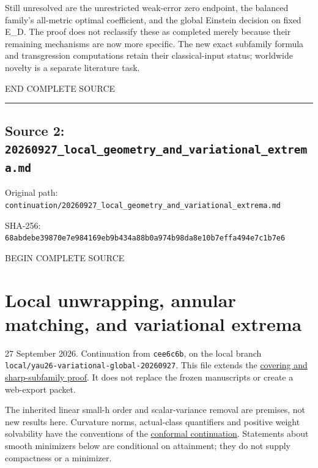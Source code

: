 \documentclass[
  10pt,
]{article}
\begin{document}
Still unresolved are the unrestricted weak-error zero endpoint, the
balanced family's all-metric optimal coefficient, and the global
Einstein decision on fixed E\_D. The proof does not reclassify these as
completed merely because their remaining mechanisms are now more
specific. The new exact subfamily formula and transgression computations
retain their classical-input status; worldwide novelty is a separate
literature task.

END COMPLETE SOURCE

\begin{center}\rule{0.5\linewidth}{0.5pt}\end{center}

\hypertarget{source-2-20260927_local_geometry_and_variational_extrema.md}{%
\subsection{Source 2:
\nolinkurl{20260927_local_geometry_and_variational_extrema.md}}\label{source-2-20260927_local_geometry_and_variational_extrema.md}}

Original path:
\nolinkurl{continuation/20260927_local_geometry_and_variational_extrema.md}

SHA-256:
\nolinkurl{68abdebe39870e7e984169eb9b434a88b0a974b98da8e10b7effa494e7c1b7e6}

BEGIN COMPLETE SOURCE

\hypertarget{local-unwrapping-annular-matching-and-variational-extrema}{%
\section{Local unwrapping, annular matching, and variational
extrema}\label{local-unwrapping-annular-matching-and-variational-extrema}}

27 September 2026. Continuation from \texttt{cee6c6b}, on the local
branch \nolinkurl{local/yau26-variational-global-20260927}. This file
extends the
\href{20260927_covering_geometry_and_sharp_subfamilies.md}{covering and
sharp-subfamily proof}. It does not replace the frozen manuscripts or
create a web-export packet.

The inherited linear small-h order and scalar-variance removal are
premises, not new results here. Curvature norms, actual-class
quantifiers and positive weight solvability have the conventions of the
\href{20260927_conformal_separation_and_zero_end.md}{conformal
continuation}. Statements about smooth minimizers below are conditional
on attainment; they do not supply compactness or a minimizer.
\end{document}

